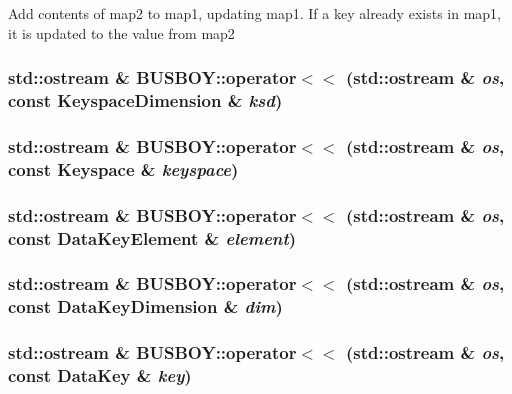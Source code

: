 Add contents of map2 to map1, updating map1. If a key already exists in map1, it is updated to the value from map2 \hypertarget{namespaceBUSBOY_a6c78735918c3de429c845f19928761ee}{
\subsubsection[{operator$<$$<$}]{\setlength{\rightskip}{0pt plus 5cm}std::ostream \& BUSBOY::operator$<$$<$ (std::ostream \& {\em os}, \/  const KeyspaceDimension \& {\em ksd})}}
\label{namespaceBUSBOY_a6c78735918c3de429c845f19928761ee}
\hypertarget{namespaceBUSBOY_a2fe378367a91118bd460bb2949833f07}{
\subsubsection[{operator$<$$<$}]{\setlength{\rightskip}{0pt plus 5cm}std::ostream \& BUSBOY::operator$<$$<$ (std::ostream \& {\em os}, \/  const Keyspace \& {\em keyspace})}}
\label{namespaceBUSBOY_a2fe378367a91118bd460bb2949833f07}
\hypertarget{namespaceBUSBOY_ab363c0d7faea2289510d7538af45dbf4}{
\subsubsection[{operator$<$$<$}]{\setlength{\rightskip}{0pt plus 5cm}std::ostream \& BUSBOY::operator$<$$<$ (std::ostream \& {\em os}, \/  const DataKeyElement \& {\em element})}}
\label{namespaceBUSBOY_ab363c0d7faea2289510d7538af45dbf4}
\hypertarget{namespaceBUSBOY_aef9a872b4e1de144c66c31eebe6cb391}{
\subsubsection[{operator$<$$<$}]{\setlength{\rightskip}{0pt plus 5cm}std::ostream \& BUSBOY::operator$<$$<$ (std::ostream \& {\em os}, \/  const DataKeyDimension \& {\em dim})}}
\label{namespaceBUSBOY_aef9a872b4e1de144c66c31eebe6cb391}
\hypertarget{namespaceBUSBOY_a37db6513c53aae204080d673cf0fe9ac}{
\subsubsection[{operator$<$$<$}]{\setlength{\rightskip}{0pt plus 5cm}std::ostream \& BUSBOY::operator$<$$<$ (std::ostream \& {\em os}, \/  const DataKey \& {\em key})}}
